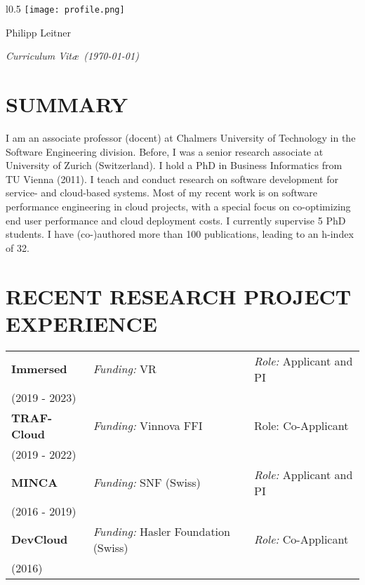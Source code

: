 \documentclass[paper=letter,fontsize=11pt]{scrartcl} %
\newcommand{\MyName}[1]{ %
	\Huge \usefont{OT1}{phv}{b}{n} \hfill #1
	\par \normalsize \normalfont}
\newcommand{\MySlogan}[1]{ %
	\large \usefont{OT1}{phv}{m}{n}\hfill \textit{#1}
	\par \normalsize \normalfont}
\newcommand{\NewPart}[2]{\section*{\uppercase{#1} #2}}
\begin{document}

\begin{wrapfigure}{l}{0.5\textwidth}
\vspace*{-2em}
	\texttt{[image: profile.png]}
\end{wrapfigure}

\MyName{Philipp Leitner}
\MySlogan{Curriculum Vit\ae\ (\today)}

\vspace{0.5cm}

\NewPart{Summary}{}
I am an associate professor (docent) at Chalmers University of Technology in the Software Engineering division. Before, I was a senior research associate at University of Zurich (Switzerland). I hold a PhD in Business Informatics from TU Vienna (2011). I teach and conduct research on software development for service- and cloud-based systems. Most of my recent work is on software performance engineering in cloud projects, with a special focus on co-optimizing end user performance and cloud deployment costs. I currently supervise 5 PhD students. I have (co-)authored more than 100 publications, leading to an h-index of 32.

\vspace{-0.2cm}

\NewPart{Recent Research Project Experience}{}

\begin{tabular}{p{4.8cm}ll}
	\textbf{Immersed} & \emph{Funding:} VR & \emph{Role:} Applicant and PI \\
	(2019 - 2023) & & \\
	\textbf{TRAF-Cloud} & \emph{Funding:} Vinnova FFI & Role: Co-Applicant \\
	(2019 - 2022) & & \\
		\textbf{MINCA} & \emph{Funding:} SNF (Swiss) & \emph{Role:} Applicant and PI \\
	(2016 - 2019) & & \\
	\textbf{DevCloud} & \emph{Funding:} Hasler Foundation (Swiss) & \emph{Role:} Co-Applicant \\
	(2016) & & \\
\end{tabular}

\vspace{-0.2cm}
\end{document}
